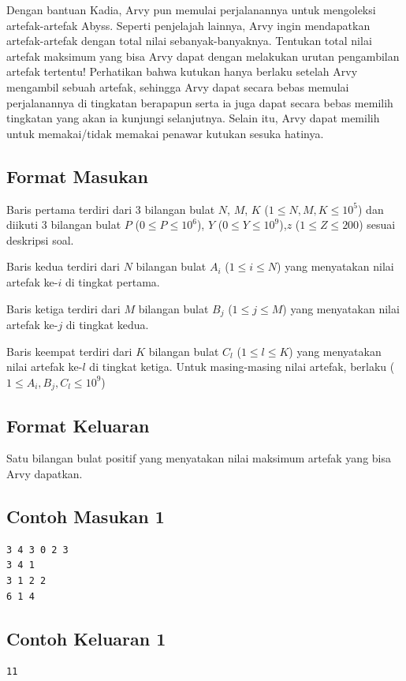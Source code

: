 \documentclass{article}
\begin{document}
Dengan bantuan Kadia, Arvy pun memulai perjalanannya untuk mengoleksi artefak-artefak Abyss. Seperti penjelajah lainnya, Arvy ingin mendapatkan artefak-artefak dengan total nilai sebanyak-banyaknya. Tentukan total nilai artefak maksimum yang bisa Arvy dapat dengan melakukan urutan pengambilan artefak tertentu! Perhatikan bahwa kutukan hanya berlaku setelah Arvy mengambil sebuah artefak, sehingga Arvy dapat secara bebas memulai perjalanannya di tingkatan berapapun serta ia juga dapat secara bebas memilih tingkatan yang akan ia kunjungi selanjutnya. Selain itu, Arvy dapat memilih untuk memakai/tidak memakai penawar kutukan sesuka hatinya. 

\subsection*{Format Masukan}
Baris pertama terdiri dari 3 bilangan bulat $N$, $M$, $K$ ($1 \leq N,M,K \leq 10^5$)  dan diikuti 3 bilangan bulat $P$ ($0 \leq P \leq  10^6$), $Y$ ($0 \leq Y \leq 10^9$),$z$ ($1 \leq Z \leq 200$) sesuai deskripsi soal.

Baris kedua terdiri dari $N$ bilangan bulat $A_i$ ($1 \leq i \leq N$) yang menyatakan nilai artefak ke-$i$ di tingkat pertama.

Baris ketiga terdiri dari $M$ bilangan bulat $B_j$ ($1 \leq j \leq M$) yang menyatakan nilai artefak ke-$j$ di tingkat kedua.

Baris keempat terdiri dari $K$ bilangan bulat $C_l$ ($1 \leq l \leq K$) yang menyatakan nilai artefak ke-$l$ di tingkat ketiga. Untuk masing-masing nilai artefak, berlaku ($1 \leq A_i,B_j,C_l \leq 10^9$)

\subsection*{Format Keluaran}
Satu bilangan bulat positif yang menyatakan nilai maksimum artefak yang bisa Arvy dapatkan.

\begin{multicols}{2}
\subsection*{Contoh Masukan 1}
\begin{lstlisting}
3 4 3 0 2 3
3 4 1
3 1 2 2
6 1 4
\end{lstlisting}
\columnbreak

\subsection*{Contoh Keluaran 1}
\begin{lstlisting}
11
\end{lstlisting}
\vfill
\null
\end{multicols}
\end{document}
